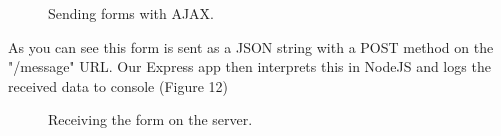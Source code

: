\documentclass[12pt]{article} %
\begin{document}
	\begin{figure}[H] %
	\caption{Sending forms with AJAX.}
	\label{AJAX}
	\end{figure}

	\noindent As you can see this form is sent as a JSON string with a POST method on the "/message" URL. Our Express app then interprets this in NodeJS and logs the received data to console (Figure 12)

	\begin{figure}[H] %
	\caption{Receiving the form on the server.}
	\label{AJAXserver}
	\end{figure}
\end{document}
